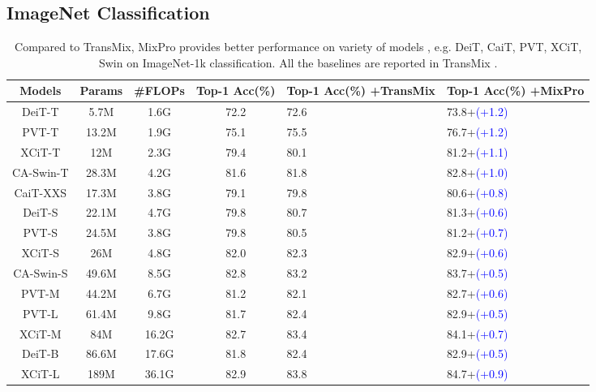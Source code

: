 \documentclass{article} \usepackage{iclr2023_conference,times}
\begin{document}
\subsection{ImageNet Classification}
\label{subCla}

\begin{table*}[!htb]\footnotesize
\caption{Compared to TransMix, MixPro provides better performance on variety of models , e.g. DeiT, CaiT, PVT, XCiT, Swin on ImageNet-1k classification. All the baselines are reported in TransMix \citep{chen2021transmix}.}
\label{tabViT}
\begin{center}
\begin{tabular}[t]{c|cccp{2cm}p{2cm}}
\toprule
Models &  Params & \#FLOPs & Top-1 Acc(\%)  & Top-1 Acc(\%) +TransMix & Top-1 Acc(\%) +MixPro \\
\midrule
DeiT-T \citep{deit}     &5.7M  &1.6G &  72.2  & 72.6 & 73.8+\textcolor{blue}{(+1.2)}\\
PVT-T  \citep{pyramidViTs}     &13.2M & 1.9G & 75.1  & 75.5 & 76.7+\textcolor{blue}{(+1.2)} \\
XCiT-T \citep{ali2021xcit}     & 12M &2.3G & 79.4  & 80.1 & 81.2+\textcolor{blue}{(+1.1)} \\
CA-Swin-T \citep{swin}     &28.3M &4.2G &  81.6  & 81.8 & 82.8+\textcolor{blue}{(+1.0)} \\
\midrule
CaiT-XXS    &17.3M &3.8G &  79.1  & 79.8 & 80.6+\textcolor{blue}{(+0.8)} \\
DeiT-S \citep{deit}      &22.1M & 4.7G & 79.8  &80.7 & 81.3+\textcolor{blue}{(+0.6)} \\
PVT-S  \citep{pyramidViTs}      &24.5M & 3.8G &  79.8  & 80.5 & 81.2+\textcolor{blue}{(+0.7)} \\
XCiT-S  \citep{ali2021xcit}     &26M & 4.8G & 82.0  & 82.3 & 82.9+\textcolor{blue}{(+0.6)} \\
CA-Swin-S  \citep{swin}     &49.6M &8.5G & 82.8  & 83.2 & 83.7+\textcolor{blue}{(+0.5)} \\
\midrule
PVT-M  \citep{pyramidViTs}      &44.2M &6.7G &  81.2  & 82.1 & 82.7+\textcolor{blue}{(+0.6)} \\
PVT-L  \citep{pyramidViTs}      &61.4M & 9.8G & 81.7  & 82.4 & 82.9+\textcolor{blue}{(+0.5)} \\
XCiT-M  \citep{ali2021xcit}     &84M &16.2G &82.7     & 83.4 & 84.1+\textcolor{blue}{(+0.7)} \\
DeiT-B  \citep{deit}     & 86.6M &17.6G & 81.8  & 82.4 & 82.9+\textcolor{blue}{(+0.5)}\\
\midrule
XCiT-L \citep{ali2021xcit} & 189M &36.1G &  82.9  & 83.8 & 84.7+\textcolor{blue}{(+0.9)} \\
\bottomrule
\end{tabular}
\end{center}
\vspace{-10px}
\end{table*}
\end{document}
